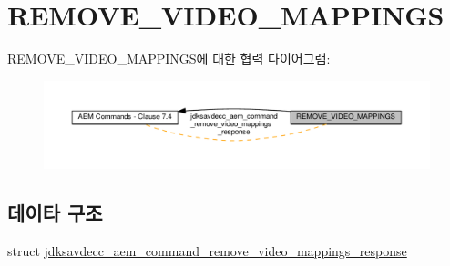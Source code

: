 \hypertarget{group__command__remove__video__mappings__response}{}\section{R\+E\+M\+O\+V\+E\+\_\+\+V\+I\+D\+E\+O\+\_\+\+M\+A\+P\+P\+I\+N\+GS}
\label{group__command__remove__video__mappings__response}
R\+E\+M\+O\+V\+E\+\_\+\+V\+I\+D\+E\+O\+\_\+\+M\+A\+P\+P\+I\+N\+G\+S에 대한 협력 다이어그램\+:
\nopagebreak
\begin{figure}[H]
\begin{center}
\leavevmode
\includegraphics[width=350pt]{group__command__remove__video__mappings__response}
\end{center}
\end{figure}
\subsection*{데이타 구조}
\begin{DoxyCompactItemize}
\item 
struct \hyperlink{structjdksavdecc__aem__command__remove__video__mappings__response}{jdksavdecc\+\_\+aem\+\_\+command\+\_\+remove\+\_\+video\+\_\+mappings\+\_\+response}
\end{DoxyCompactItemize}
